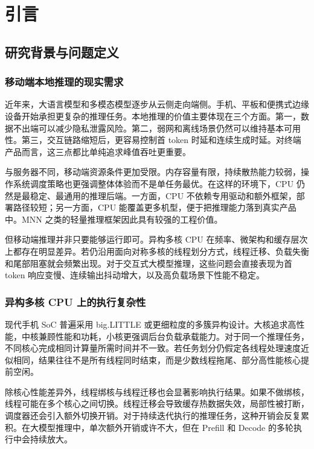 \chapter{引言}

\section{研究背景与问题定义}

\subsection{移动端本地推理的现实需求}

近年来，大语言模型和多模态模型逐步从云侧走向端侧。手机、平板和便携式边缘设备开始承担更复杂的推理任务。本地推理的价值主要体现在三个方面。第一，数据不出端可以减少隐私泄露风险。第二，弱网和离线场景仍然可以维持基本可用性。第三，交互链路缩短后，更容易控制首 token 时延和连续生成时延。对终端产品而言，这三点都比单纯追求峰值吞吐更重要。

与服务器不同，移动端资源条件更加受限。内存容量有限，持续散热能力较弱，操作系统调度策略也更强调整体体验而不是单任务最优。在这样的环境下，CPU 仍然是最稳定、最通用的推理后端。一方面，CPU 不依赖专用驱动和额外框架，部署路径较短；另一方面，CPU 能覆盖更多机型，便于把推理能力落到真实产品中。MNN 之类的轻量推理框架因此具有较强的工程价值\cite{jiang2020mnn}。

但移动端推理并非只要能够运行即可。异构多核 CPU 在频率、微架构和缓存层次上都存在明显差异。若仍沿用面向对称多核的线程划分方式，线程迁移、负载失衡和尾部阻塞就会频繁出现。对于交互式大模型推理，这些问题会直接表现为首 token 响应变慢、连续输出抖动增大，以及高负载场景下性能不稳定。

\subsection{异构多核 CPU 上的执行复杂性}

现代手机 SoC 普遍采用 big.LITTLE 或更细粒度的多簇异构设计。大核追求高性能，中核兼顾性能和功耗，小核更强调后台负载承载能力。对于同一个推理任务，不同核心完成相同计算量所需时间并不一致。若任务划分仍假定各线程处理速度近似相同，结果往往不是所有线程同时结束，而是少数线程拖尾、部分高性能核心提前空闲。

除核心性能差异外，线程绑核与线程迁移也会显著影响执行结果。如果不做绑核，线程可能在多个核心之间切换。线程迁移会导致缓存热数据失效，局部性被打断，调度器还会引入额外切换开销。对于持续迭代执行的推理任务，这种开销会反复累积。在大模型推理中，单次额外开销或许不大，但在 Prefill 和 Decode 的多轮执行中会持续放大。

